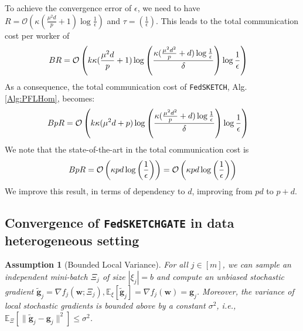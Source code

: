 \documentclass[review,onefignum,onetabnum]{siamart190516}
\newtheorem{assumption}{Assumption}
\begin{document}
\begin{corollary}
To achieve the convergence error of $\epsilon$, we need to have $R=\mathcal{O}\left(\kappa(\frac{\mu^2d}{p}+1)\log\frac{1}{\epsilon}\right)$ and $\tau=\left(\frac{1}{\epsilon}\right)$. This leads to the total communication cost per worker of 
\begin{align}\notag
BR&=\mathcal{O}\left(k\kappa(\frac{\mu^2d}{p}+1)\log\left(\frac{\kappa(\frac{\mu^2d^2}{p}+d)\log\frac{1}{\epsilon}}{\delta}\right)\log\frac{1}{\epsilon} \right)
\end{align}
As a consequence, the total communication cost of \texttt{FedSKETCH}, Alg.\ref{Alg:PFLHom}, becomes:
\begin{align}\notag
BpR&=\mathcal{O}\left(k\kappa(\mu^2d+p)\log\left(\frac{\kappa(\frac{\mu^2d^2}{p}+d)\log\frac{1}{\epsilon}}{\delta}\right)\log\frac{1}{\epsilon} \right)
\end{align}
We note that the state-of-the-art in \cite{karimireddy2019scaffold} the total communication cost is 
\begin{align}\notag
    BpR=\mathcal{O}\left(\kappa pd\log\left(\frac{1}{\epsilon}\right) \right)=\mathcal{O}\left(\kappa pd\log\left(\frac{1}{\epsilon}\right)\right) 
\end{align}
We improve this result, in terms of dependency to $d$, improving from $pd$ to $p+d$.
\end{corollary}


\subsection{Convergence of  \texttt{FedSKETCHGATE} in data heterogeneous setting} 
\begin{assumption}[Bounded Local Variance]\label{Assu:2}
For all $j\in [m]$, we can sample an independent mini-batch $\Xi_j$   of size $|{\xi}_j| = b$ and compute an unbiased stochastic gradient $\tilde{\mathbf{g}}_j = \nabla f_j(\boldsymbol{w}; \Xi_j), \mathbb{E}_{\xi}[\tilde{\mathbf{g}}_j] = \nabla f_{j}(\boldsymbol{w})={\mathbf{g}}_j$. Moreover, the variance of local stochastic gradients is bounded above by a constant $\sigma^2$, i.e., $
\mathbb{E}_{\Xi}\left[\|\tilde{\mathbf{g}}_j-{\mathbf{g}}_j\|^2\right]\leq \sigma^2$.
\end{assumption}
\end{document}
